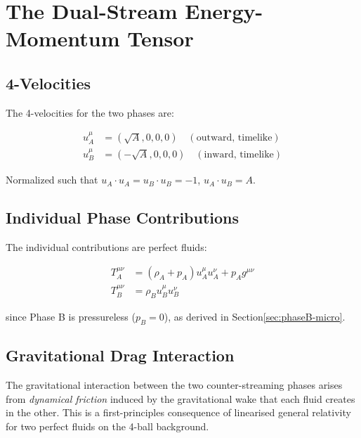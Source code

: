 \documentclass[10pt,twocolumn]{article}
\theoremstyle{definition}
\newcommand{\rhoA}{\rho_{A}}
\newcommand{\rhoB}{\rho_{B}}
\begin{document}
\section{The Dual-Stream Energy-Momentum Tensor}
\label{sec:emt}

\subsection{4-Velocities}

The 4-velocities for the two phases are:

\begin{align}
  u_{A}^{\mu} &= (\sqrt{A}, 0, 0, 0) \quad (\text{outward, timelike}) \\
  u_{B}^{\mu} &= (-\sqrt{A}, 0, 0, 0) \quad (\text{inward, timelike})
\end{align}

Normalized such that \( u_{A} \cdot u_{A} = u_{B} \cdot u_{B} = -1 \), \( u_{A} \cdot u_{B} = A \).

\subsection{Individual Phase Contributions}

The individual contributions are perfect fluids:

\begin{align}
  T_{A}^{\mu\nu} &= (\rhoA + p_{A}) u_{A}^{\mu} u_{A}^{\nu} + p_{A} g^{\mu\nu} \\
  T_{B}^{\mu\nu} &= \rhoB u_{B}^{\mu} u_{B}^{\nu}
\end{align}

since Phase B is pressureless (\( p_{B} = 0 \)), as derived in Section\nobreakspace{}\ref{sec:phaseB-micro}.




\subsection{Gravitational Drag Interaction}
\label{sec:drag-micro}

The gravitational interaction between the two counter-streaming phases arises from \emph{dynamical friction} induced by the gravitational wake that each fluid creates in the other. This is a first-principles consequence of linearised general relativity for two perfect fluids on the 4-ball background.
\end{document}
